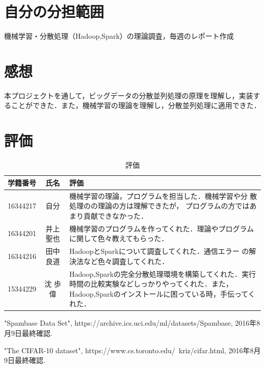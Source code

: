 \documentclass[a4paper,12pt]{jarticle}
\begin{document}
\section{自分の分担範囲}
機械学習・分散処理（Hadoop,Spark）の理論調査，毎週のレポート作成
\section{感想}
本プロジェクトを通して，ビッグデータの分散並列処理の原理を理解し，実装す
ることができた．また，機械学習の理論を理解し，分散並列処理に適用できた．
\section{評価}
\begin{table}[hbtp]
\centering
\caption{評価}
\label{tab:評価}
\fontsize{9pt}{10pt}\selectfont
\begin{tabular}{c|c||p{100mm}} \hline
 学籍番号&氏名     &評価   \\ \hline \hline
 16344217&自分& 機械学習の理論，プログラムを担当した．機械学習や分
		 散処理のの理論の方は理解できたが，
		 プログラムの方ではあまり貢献できなかった．\\ \hline
16344201&井上 聖也&機械学習のプログラムを作ってくれた．理論やプログラム
		 に関して色々教えてもらった．\\ \hline
16344216&田中 良道& HadoopとSparkについて調査してくれた．通信エラー
		 の解決法など色々調査してくれた．\\ \hline 
15344229&沈 歩偉　& Hadoop,Sparkの完全分散処理環境を構築してくれた．実行
		 時間の比較実験などしっかりやってくれた．また，
		 Hadoop,Sparkのインストールに困っている時，手伝ってくれた． \\ \hline
\end{tabular}
\end{table}


\begin{thebibliography}{99}

  "Spambase Data Set",
		 https://archive.ics.uci.edu/ml/datasets/Spambase, 2016年8月9日最終確認.

  "The CIFAR-10 dataset",
		 https://www.cs.toronto.edu/~kriz/cifar.html, 2016年8月9日最終確認.

\end{thebibliography}
\end{document}
